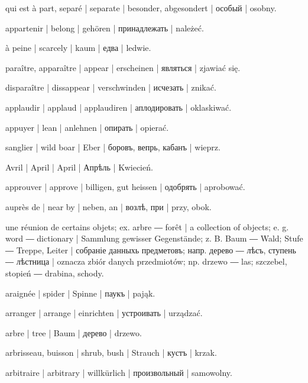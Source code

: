 \begin{outdent}{1em}
qui est à part, separé | separate | besonder, abgesondert | особый | osobny.

appartenir | belong | gehören | принадлежать | należeć.

à peine | scarcely | kaum | едва | ledwie.

paraître, apparaître | appear | erscheinen | являться | zjawiać się.

\uvsubentry{}
disparaître | dissappear | verschwinden | исчезать | znikać.

applaudir | applaud | applaudiren | аплодировать | oklaskiwać.

appuyer | lean | anlehnen | опирать | opierać.

sanglier | wild boar | Eber | боровъ, вепрь, кабанъ | wieprz.

Avril | April | April | Апрѣль | Kwiecień.

approuver | approve | billigen, gut heissen | одобрять | aprobować.

auprès de | near by | neben, an | возлѣ, при | przy, obok.

une réunion de certains objets; ex.  arbre ― 
forêt | a collection of objects; e. g.  word ― 
dictionary | Sammlung gewisser Gegenstände; z. B.  Baum ―
 Wald;  Stufe ―  Treppe, Leiter | собраніе данныхь предметовъ; напр.  дерево ―  лѣсъ,
 ступень ―  лѣстница | oznacza zbiór danych przedmiotów; np.  drzewo ―  las;
 szczebel, stopień ―  drabina, schody.

araignée | spider | Spinne | паукъ | pająk.

arranger | arrange | einrichten | устроивать | urządzać.

arbre | tree | Baum | дерево | drzewo.

\uvsubentry{}
arbrisseau, buisson | shrub, bush | Strauch | кустъ | krzak.

arbitraire | arbitrary | willkürlich | произвольный | samowolny.


\end{outdent}
